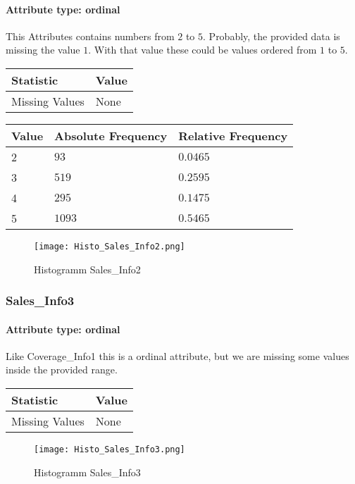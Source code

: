 \paragraph{Attribute type: ordinal} This Attributes contains numbers from $2$ to $5$. Probably, the provided data is missing the value $1$. With that value these could be values ordered from $1$ to $5$.
\qquad
\begin{table}[H]
	\renewcommand{\arraystretch}{1.25}
	\begin{tabular}{l|l}
		\textbf{Statistic} & \textbf{Value}\\\hline
		Missing Values& None\\\hline
	\end{tabular}
\end{table}
\begin{table}[H]
	\renewcommand{\arraystretch}{1.25}
	\begin{tabular}{l|l|l}
		\textbf{Value} & \textbf{Absolute Frequency} & \textbf{Relative Frequency}\\\hline
		2&$93$&$0.0465$\\\hline
		3&$519$&$0.2595$\\\hline
		4&$295$&$0.1475$\\\hline
		5&$1093$&$0.5465$
	\end{tabular}
\end{table}
\begin{figure}[H]
	\begin{center}
		\texttt{[image: Histo\_Sales\_Info2.png]}
	\end{center}
	\caption{Histogramm Sales\_Info2}
\end{figure}

\subsubsection{Sales\_Info3}
\paragraph{Attribute type: ordinal} Like Coverage\_Info1 this is a ordinal attribute, but we are missing some values inside the provided range.

\qquad
\begin{table}[H]
	\renewcommand{\arraystretch}{1.25}
	\begin{tabular}{l|l}
		\textbf{Statistic} & \textbf{Value}\\\hline
		Missing Values& None\\\hline
	\end{tabular}
\end{table}
\begin{figure}[H]
	\begin{center}
		\texttt{[image: Histo\_Sales\_Info3.png]}
	\end{center}
	\caption{Histogramm Sales\_Info3}
\end{figure}

